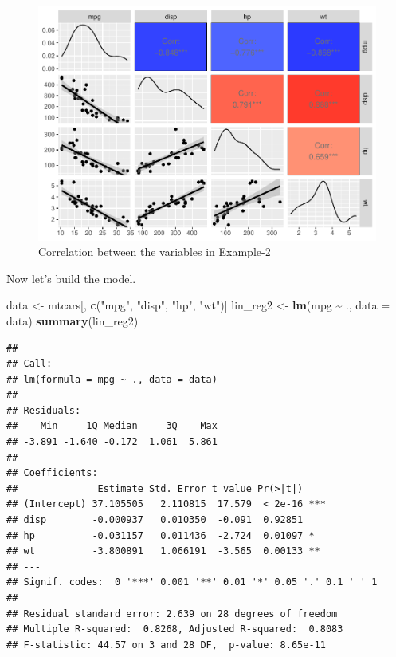 \documentclass[
]{book}
\newenvironment{Shaded}{\begin{snugshade}}{\end{snugshade}}
\newcommand{\AttributeTok}[1]{\textcolor[rgb]{0.13,0.29,0.53}{#1}}
\newcommand{\FunctionTok}[1]{\textcolor[rgb]{0.13,0.29,0.53}{\textbf{#1}}}
\newcommand{\NormalTok}[1]{#1}
\newcommand{\OtherTok}[1]{\textcolor[rgb]{0.56,0.35,0.01}{#1}}
\newcommand{\SpecialCharTok}[1]{\textcolor[rgb]{0.81,0.36,0.00}{\textbf{#1}}}
\newcommand{\StringTok}[1]{\textcolor[rgb]{0.31,0.60,0.02}{#1}}
\begin{document}
\begin{figure}

{\centering \includegraphics{DauR_files/figure-latex/ex2vis2-1} 

}

\caption{Correlation between the variables in Example-2}\label{fig:ex2vis2}
\end{figure}

Now let's build the model.

\begin{Shaded}
\begin{Highlighting}[]
\NormalTok{data }\OtherTok{\textless{}{-}}\NormalTok{ mtcars[, }\FunctionTok{c}\NormalTok{(}\StringTok{"mpg"}\NormalTok{, }\StringTok{"disp"}\NormalTok{, }\StringTok{"hp"}\NormalTok{, }\StringTok{"wt"}\NormalTok{)]}
\NormalTok{lin\_reg2 }\OtherTok{\textless{}{-}} \FunctionTok{lm}\NormalTok{(mpg }\SpecialCharTok{\textasciitilde{}}\NormalTok{ ., }
               \AttributeTok{data =}\NormalTok{ data)}
\FunctionTok{summary}\NormalTok{(lin\_reg2)}
\end{Highlighting}
\end{Shaded}

\begin{verbatim}
## 
## Call:
## lm(formula = mpg ~ ., data = data)
## 
## Residuals:
##    Min     1Q Median     3Q    Max 
## -3.891 -1.640 -0.172  1.061  5.861 
## 
## Coefficients:
##              Estimate Std. Error t value Pr(>|t|)    
## (Intercept) 37.105505   2.110815  17.579  < 2e-16 ***
## disp        -0.000937   0.010350  -0.091  0.92851    
## hp          -0.031157   0.011436  -2.724  0.01097 *  
## wt          -3.800891   1.066191  -3.565  0.00133 ** 
## ---
## Signif. codes:  0 '***' 0.001 '**' 0.01 '*' 0.05 '.' 0.1 ' ' 1
## 
## Residual standard error: 2.639 on 28 degrees of freedom
## Multiple R-squared:  0.8268, Adjusted R-squared:  0.8083 
## F-statistic: 44.57 on 3 and 28 DF,  p-value: 8.65e-11
\end{verbatim}
\end{document}
